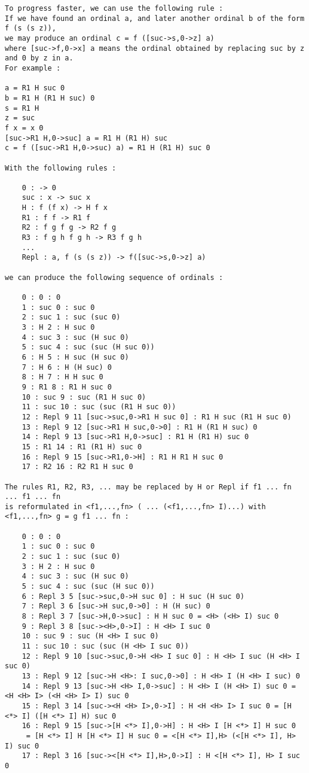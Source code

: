 \documentclass[10pt]{article}
\begin{document}
\begin{verbatim}
To progress faster, we can use the following rule :
If we have found an ordinal a, and later another ordinal b of the form f (s (s z)), 
we may produce an ordinal c = f ([suc->s,0->z] a) 
where [suc->f,0->x] a means the ordinal obtained by replacing suc by z and 0 by z in a.
For example :

a = R1 H suc 0
b = R1 H (R1 H suc) 0
s = R1 H
z = suc
f x = x 0
[suc->R1 H,0->suc] a = R1 H (R1 H) suc
c = f ([suc->R1 H,0->suc) a) = R1 H (R1 H) suc 0

With the following rules :

    0 : -> 0
    suc : x -> suc x
    H : f (f x) -> H f x
    R1 : f f -> R1 f
    R2 : f g f g -> R2 f g
    R3 : f g h f g h -> R3 f g h
    ...
    Repl : a, f (s (s z)) -> f([suc->s,0->z] a) 

we can produce the following sequence of ordinals :

    0 : 0 : 0
    1 : suc 0 : suc 0
    2 : suc 1 : suc (suc 0)
    3 : H 2 : H suc 0
    4 : suc 3 : suc (H suc 0)
    5 : suc 4 : suc (suc (H suc 0))
    6 : H 5 : H suc (H suc 0)
    7 : H 6 : H (H suc) 0
    8 : H 7 : H H suc 0
    9 : R1 8 : R1 H suc 0
    10 : suc 9 : suc (R1 H suc 0)
    11 : suc 10 : suc (suc (R1 H suc 0))
    12 : Repl 9 11 [suc->suc,0->R1 H suc 0] : R1 H suc (R1 H suc 0)
    13 : Repl 9 12 [suc->R1 H suc,0->0] : R1 H (R1 H suc) 0
    14 : Repl 9 13 [suc->R1 H,0->suc] : R1 H (R1 H) suc 0
    15 : R1 14 : R1 (R1 H) suc 0
    16 : Repl 9 15 [suc->R1,0->H] : R1 H R1 H suc 0
    17 : R2 16 : R2 R1 H suc 0 

The rules R1, R2, R3, ... may be replaced by H or Repl if f1 ... fn ... f1 ... fn 
is reformulated in <f1,...,fn> ( ... (<f1,...,fn> I)...) with <f1,...,fn> g = g f1 ... fn :

    0 : 0 : 0
    1 : suc 0 : suc 0
    2 : suc 1 : suc (suc 0)
    3 : H 2 : H suc 0
    4 : suc 3 : suc (H suc 0)
    5 : suc 4 : suc (suc (H suc 0))
    6 : Repl 3 5 [suc->suc,0->H suc 0] : H suc (H suc 0)
    7 : Repl 3 6 [suc->H suc,0->0] : H (H suc) 0
    8 : Repl 3 7 [suc->H,0->suc] : H H suc 0 = <H> (<H> I) suc 0
    9 : Repl 3 8 [suc-><H>,0->I] : H <H> I suc 0
    10 : suc 9 : suc (H <H> I suc 0)
    11 : suc 10 : suc (suc (H <H> I suc 0))
    12 : Repl 9 10 [suc->suc,0->H <H> I suc 0] : H <H> I suc (H <H> I suc 0)
    13 : Repl 9 12 [suc->H <H>: I suc,0->0] : H <H> I (H <H> I suc) 0
    14 : Repl 9 13 [suc->H <H> I,0->suc] : H <H> I (H <H> I) suc 0 = <H <H> I> (<H <H> I> I) suc 0
    15 : Repl 3 14 [suc-><H <H> I>,0->I] : H <H <H> I> I suc 0 = [H <*> I] ([H <*> I] H) suc 0
    16 : Repl 9 15 [suc->[H <*> I],0->H] : H <H> I [H <*> I] H suc 0 
     = [H <*> I] H [H <*> I] H suc 0 = <[H <*> I],H> (<[H <*> I], H> I) suc 0
    17 : Repl 3 16 [suc-><[H <*> I],H>,0->I] : H <[H <*> I], H> I suc 0 




\end{verbatim}
\end{document}
